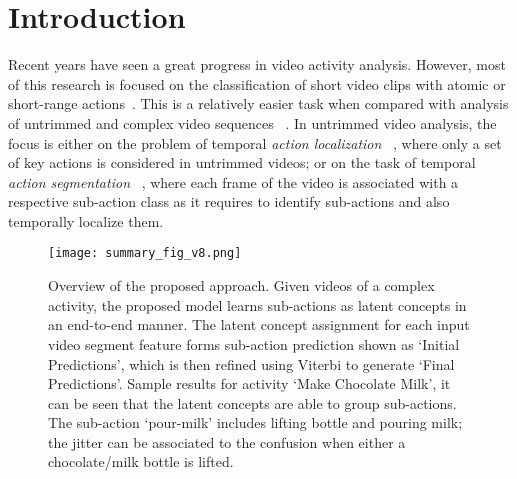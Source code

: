 \documentclass[final]{cvpr}
\begin{document}
\vspace{-0.6cm}
\section{Introduction}
\par Recent years have seen a great progress in video activity analysis. However, most of this research is focused on the classification of short video clips with atomic or short-range actions~\cite{ rl-a-carreira2017quo, rl-a-feichtenhofer2019slowfast, rl-a-simonyan2014two}. This is a relatively easier task when compared with analysis of untrimmed and complex video sequences
~\cite{aakur2019perceptual, Alayrac16unsupervised,  hussein2019timeception, hussein2019videograph, bf-Kuehne12, kuehne2016end, sener2018unsupervised, rl-c-shou2017cdc,  rl-c-yeung2016end}. In untrimmed video analysis, the focus is either on the problem of temporal {\em action localization} ~\cite{ad-chen2019relation, ad-long2019gaussian, ad-xu2019g, ad-zeng2019graph}, where only a set of key actions is considered in untrimmed videos; or on the task of temporal {\em action segmentation} ~\cite{kuehne2016end, sener2018unsupervised, tcfpn-ding2018weakly, as-Richard_2018_CVPR, kukleva2019unsupervised, as-Farha_2019_CVPR}, where each frame of the video is associated with a respective sub-action class as it requires to identify sub-actions and also temporally localize them.  

\begin{figure}[t]
  \texttt{[image: summary\_fig\_v8.png]}
\caption{{\small Overview of the proposed approach. Given videos of a complex activity, the proposed model learns sub-actions as latent concepts in an end-to-end manner.
The latent concept assignment for each input video segment feature forms sub-action prediction shown as `Initial Predictions', which is then refined using Viterbi to generate `Final Predictions'. Sample results for activity `Make Chocolate Milk', it can be seen that the latent concepts are able to group sub-actions. The sub-action `pour-milk' includes lifting bottle and pouring milk; the jitter can be associated to the confusion when either a chocolate/milk bottle is lifted. 
}}
\vspace{-0.3cm}
\label{fig:summ}
\end{figure}
\vspace{-0.15cm}
\end{document}
